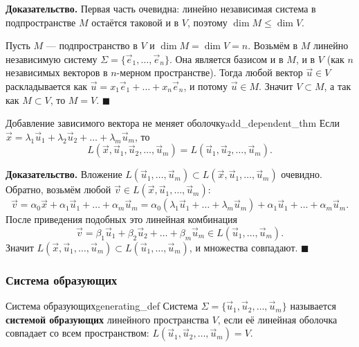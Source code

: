 \documentclass[12pt,a4paper]{article}
\newenvironment{myproof}{\noindent\textbf{Доказательство.}}{\hfill$\blacksquare$}
\begin{document}
\begin{myproof}
  Первая часть очевидна: линейно независимая система в подпространстве
  $M$ остаётся таковой и в $V$, поэтому $\dim M \le \dim V$.

  Пусть $M$ --- подпространство в $V$ и $\dim M = \dim V = n$.
  Возьмём в $M$ линейно независимую систему $\Sigma = \{\vec{e}_1,
  \dots, \vec{e}_n\}$. Она является базисом и в $M$, и в $V$ (как $n$
  независимых векторов в $n$-мерном пространстве). Тогда любой вектор
  $\vec{u} \in V$ раскладывается как $\vec{u} = x_1\vec{e}_1 + \dots +
  x_n\vec{e}_n$, и потому $\vec{u} \in M$. Значит $V \subset M$, а так
  как $M \subset V$, то $M = V$.
\end{myproof}

\begin{theorem}{Добавление зависимого вектора не меняет
  оболочку}{add_dependent_thm}
  Если $\vec{x} = \lambda_1\vec{u}_1 + \lambda_2\vec{u}_2 + \dots +
  \lambda_m\vec{u}_m$, то
  \[
    L(\vec{x}, \vec{u}_1, \vec{u}_2, \dots, \vec{u}_m) = L(\vec{u}_1,
    \vec{u}_2, \dots, \vec{u}_m).
  \]
\end{theorem}

\begin{myproof}
  Вложение $L(\vec{u}_1, \dots, \vec{u}_m) \subset L(\vec{x},
  \vec{u}_1, \dots, \vec{u}_m)$ очевидно. Обратно, возьмём любой
  $\vec{v} \in L(\vec{x}, \vec{u}_1, \dots, \vec{u}_m)$:
  \[
    \vec{v} = \alpha_0\vec{x} + \alpha_1\vec{u}_1 + \dots +
    \alpha_m\vec{u}_m = \alpha_0(\lambda_1\vec{u}_1 + \dots +
    \lambda_m\vec{u}_m) + \alpha_1\vec{u}_1 + \dots +
    \alpha_m\vec{u}_m.
  \]
  После приведения подобных это линейная комбинация
  \[
    \vec{v} = \beta_1\vec{u}_1 + \beta_2\vec{u}_2 + \dots +
    \beta_m\vec{u}_m \in L(\vec{u}_1, \dots, \vec{u}_m).
  \]
  Значит $L(\vec{x}, \vec{u}_1, \dots, \vec{u}_m) \subset L(\vec{u}_1,
  \dots, \vec{u}_m)$, и множества совпадают.
\end{myproof}

\subsubsection*{Система образующих}

\begin{definition}{Система образующих}{generating_def}
  Система $\Sigma = \{\vec{u}_1, \vec{u}_2, \dots, \vec{u}_m\}$
  называется \textbf{системой образующих} линейного пространства $V$,
  если её линейная оболочка совпадает со всем пространством:
  $L(\vec{u}_1, \vec{u}_2, \dots, \vec{u}_m) = V$.
\end{definition}
\end{document}
